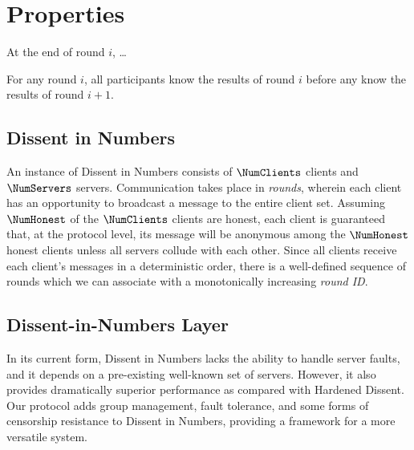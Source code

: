   \section{Properties}
  \begin{theorem} At the end of round $i$, \ldots {}\end{theorem}
  \begin{theorem} For any round $i$, all participants know the results of round
    $i$ before any know the results of round
    $i+1$.\end{theorem}\label{theorem:rounds}
\subsection{Dissent in Numbers}
An instance of Dissent in Numbers consists of $\NumClients$ clients and
$\NumServers$ servers.  Communication takes place in \emph{rounds}, wherein each
client has an opportunity to broadcast a message to the entire client set.
Assuming $\NumHonest$ of the $\NumClients$ clients are honest, each client is
guaranteed that, at the protocol level, its message will be anonymous among the
$\NumHonest$ honest clients unless all servers collude with each
other. Since all clients receive each client's messages in a
deterministic order, there is a well-defined sequence of rounds which we can
associate with a monotonically increasing \emph{round ID}.

\subsection{Dissent-in-Numbers Layer}
In its current form, Dissent in Numbers lacks the ability to handle server
faults, and it depends on a pre-existing well-known set of servers. However, it
also provides dramatically superior performance as compared with Hardened
Dissent. Our protocol adds group management, fault tolerance, and some forms of
censorship resistance to Dissent in Numbers, providing a framework for a more
versatile system.



